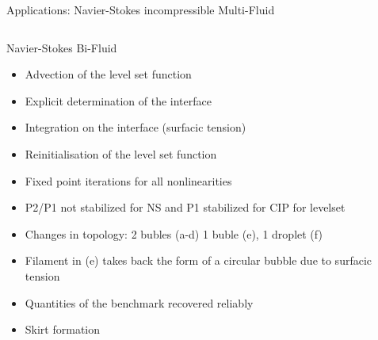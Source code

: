 \documentclass[final,utf8,,hyperref={pdfpagelabels=false}]{beamer}
\begin{document}
\begin{frame}[containsverbatim]{}
\begin{columns}[c]
\begin{block}{Applications: Navier-Stokes incompressible Multi-Fluid}
\begin{columns}[t]
\begin{column}{.48\textwidth}
\begin{block}{Navier-Stokes Bi-Fluid}
\begin{itemize}
            \item Advection of the level set function
            \item Explicit determination of the interface
            \item Integration on the interface (surfacic tension)
            \item Reinitialisation of the  level set function
              
            \item Fixed point iterations for all nonlinearities
            \item P2/P1 not stabilized for NS and P1 stabilized for CIP for levelset
              
            \item Changes in topology: 2 bubles (a-d) 1 buble (e), 1 droplet (f)
            \item Filament in (e) takes back the form of a circular bubble due
              to surfacic tension

            \item Quantities of the benchmark recovered reliably
            \item Skirt formation
            \end{itemize}
          \end{block}
        \end{column}
      \end{columns}

  \end{block}

  \end{columns}
  
  \end{frame}
\end{document}
